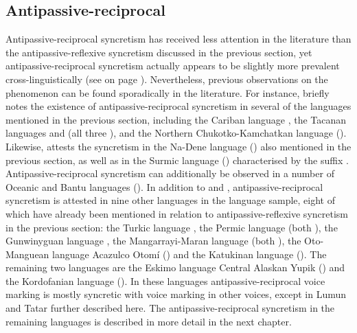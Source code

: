 \subsection{Antipassive-reciprocal} \label{sec:simple-syncretism:antp-recp}
Antipassive-reciprocal syncretism has received less attention in the literature than the antipassive-reflexive syncretism discussed in the previous section, yet antipassive-reciprocal syncretism actually appears to be slightly more prevalent cross-linguistically (see  on page \pageref{tab:ch6:voice-syncretism-simplex}). Nevertheless, previous observations on the phenomenon can be found sporadically in the literature. For instance, \citet{janic:2010} briefly notes the existence of antipassive-reciprocal syncretism in several of the languages mentioned in the previous section, including the Cariban language , the Tacanan languages  and  (all three ), and the Northern Chukotko-Kamchatkan language  (). Likewise, \citet{sanso:2017} attests the syncretism in the Na-Dene language  () also mentioned in the previous section, as well as in the Surmic language  () characterised by the suffix . Antipassive-reciprocal syncretism can additionally be observed in a number of Oceanic and Bantu languages (). In addition to  and , antipassive-reciprocal syncretism is attested in nine other languages in the language sample, eight of which have already been mentioned in relation to antipassive-reflexive syncretism in the previous section: the Turkic language , the Permic language  (both ), the Gunwinyguan language , the Mangarrayi-Maran language  (both ), the Oto-Manguean language Acazulco Otomí () and the Katukinan language  (). The remaining two languages are the Eskimo language Central Alaskan Yupik () and the Kordofanian language  (). In these languages antipassive-reciprocal voice marking is mostly syncretic with voice marking in other voices, except in Lumun and Tatar further described here. The antipassive-reciprocal syncretism in the remaining languages is described in more detail in the next chapter.


